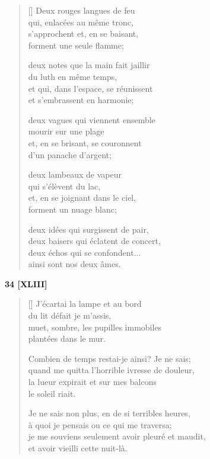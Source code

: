 \documentclass[a4paper,12pt]{book}
\begin{document}
\begin{verse}[\versewidth]
  Deux rouges langues de feu \\
  qui, enlacées au même tronc, \\
  s'approchent et, en se baisant, \\
  forment une seule flamme;

  deux notes que la main fait jaillir \\
  du luth en même temps, \\
  et qui, dans l'espace, se réunissent \\
  et s'embrassent en harmonie;

  deux vagues qui viennent ensemble \\
  mourir sur une plage \\
  et, en se brisant, se couronnent \\
  d'un panache d'argent;

  deux lambeaux de vapeur \\
  qui s'élèvent du lac, \\
  et, en se joignant dans le ciel, \\
  forment un nuage blanc;

  deux idées qui surgissent de pair, \\
  deux baisers qui éclatent de concert, \\
  deux échos qui se confondent... \\
  ainsi sont nos deux âmes.
\end{verse}

\bigskip

\begin{center}
  \textbf{34 [XLIII]}
   \end{center}

\settowidth{\versewidth}{je me souviens seulement avoir pleuré et maudit,}

\begin{verse}[\versewidth]
  J'écartai la lampe et au bord \\
  du lit défait je m'assis, \\
  muet, sombre, les pupilles immobiles \\
  plantées dans le mur.

  Combien de temps restai-je ainsi? Je ne sais; \\
  quand me quitta l'horrible ivresse de douleur, \\
  la lueur expirait et sur mes balcons \\
  le soleil riait.

  Je ne sais non plus, en de si terribles heures, \\
  à quoi je pensais ou ce qui me traversa; \\
  je me souviens seulement avoir pleuré et maudit, \\
  et avoir vieilli cette nuit-là.
\end{verse}
\end{document}
